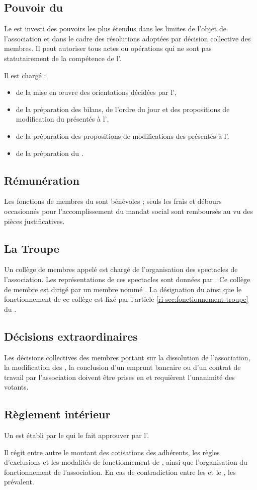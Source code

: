\documentclass[a4paper,french,10pt]{article}
\newcommand{\article}[1]{\subsection{#1}\addtocounter{article}{1}}
\newcounter{article}
\newcommand{\artrefri}[1]{article \ref{ri-#1} du \RI{}}
\begin{document}
\article{Pouvoir du \bureau{}}
\label{sec:pouvoirs}
Le \bureau{} est investi des pouvoirs les plus étendus dans les limites
de l’objet de l’association et dans le cadre des résolutions adoptées
par décision collective des membres. Il peut autoriser tous actes ou
opérations qui ne sont pas statutairement de la compétence de
l’\AG{}.

Il est chargé :
\begin{itemize}
\item de la mise en \oe{}uvre des orientations décidées par l'\AG{},

  \item de la préparation des bilans, de l'ordre du jour et des
  propositions de modification du \RI{} présentés à
  l'\AG{},

  \item de la préparation des propositions de modifications des \statuts{}
  présentés à l'\AGE{}.

  \item de la préparation du \RI{}.

  
\end{itemize}



\article{Rémunération}
\label{sec:remuneration}
Les fonctions de membres du \bureau{} sont bénévoles ; seuls les frais et
débours occasionnés pour l’accomplissement du mandat social sont
remboursés au vu des pièces justificatives.

\article{La Troupe}
\label{sec:troupe}
Un collège de membres appelé \textit{\troupe{}} est chargé de l'organisation des spectacles de l'association. Les représentations de ces spectacles sont données par \troupe{}. Ce collège de membre est dirigé par un membre nommé \DA{}. La désignation du \DA{} ainsi que le fonctionnement de ce collège est fixé par l'\artrefri{sec:fonctionnement-troupe}.

\article{Décisions extraordinaires}
\label{sec:decisions-extra}
Les décisions collectives des membres portant sur la dissolution de
l’association, la modification des \statuts{}, la conclusion d’un emprunt
bancaire ou d’un contrat de travail par l’association doivent être prises en \AG{} et requièrent l’unanimité des votants.

\article{Règlement intérieur}
\label{sec:reglement}
Un \RI{} est établi par le \bureau{} qui le fait approuver
par l’\AG{}.

Il régit entre autre le montant des cotisations des adhérents, les règles d'exclusions et les modalités de fonctionnement de \troupe{}, ainsi que l'organisation du fonctionnement de l'association. En cas de contradiction entre les \statuts{} et le \RI{}, les \statuts{} prévalent.
\end{document}
